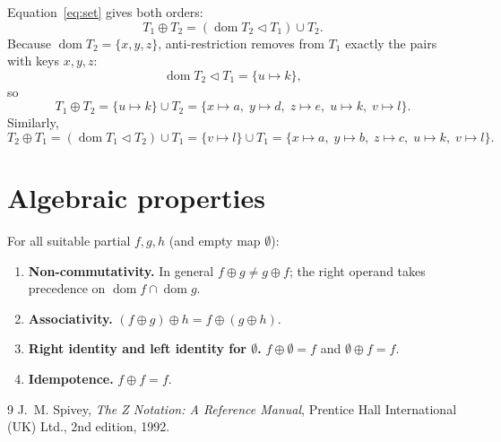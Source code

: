 \documentclass{article}
\newcommand{\dom}{\operatorname{dom}}
\begin{document}
Equation~\eqref{eq:set} gives both orders:
\[
  T_1 \oplus T_2 = (\dom T_2 \vartriangleleft T_1) \cup T_2.
\]
Because $\dom T_2=\{x,y,z\}$, anti-restriction removes from $T_1$ exactly the pairs with keys $x,y,z$:
\[
  \dom T_2 \vartriangleleft T_1 = \{u \mapsto k\},
\]
so
\[
  T_1 \oplus T_2 = \{u \mapsto k\} \cup T_2
  = \{ x \mapsto a,\; y \mapsto d,\; z \mapsto e,\; u \mapsto k,\; v \mapsto l \}.
\]
Similarly,
\[
  T_2 \oplus T_1 = (\dom T_1 \vartriangleleft T_2) \cup T_1
  = \{v \mapsto l\} \cup T_1
  = \{ x \mapsto a,\; y \mapsto b,\; z \mapsto c,\; u \mapsto k,\; v \mapsto l \}.
\]

\section{Algebraic properties}

For all suitable partial $f,g,h$ (and empty map $\emptyset$):
\begin{enumerate}
  \item \textbf{Non-commutativity.} In general $f \oplus g \neq g \oplus f$; the right operand takes precedence on $\dom f \cap \dom g$.
  \item \textbf{Associativity.} $(f \oplus g) \oplus h = f \oplus (g \oplus h)$.
  \item \textbf{Right identity and left identity for $\emptyset$.}
        $f \oplus \emptyset = f$ and $\emptyset \oplus f = f$.
  \item \textbf{Idempotence.} $f \oplus f = f$.
\end{enumerate}

\begin{thebibliography}{9}
J.~M. Spivey,
\emph{The Z Notation: A Reference Manual},
Prentice Hall International (UK) Ltd., 2nd edition, 1992.
\end{thebibliography}
\end{document}
